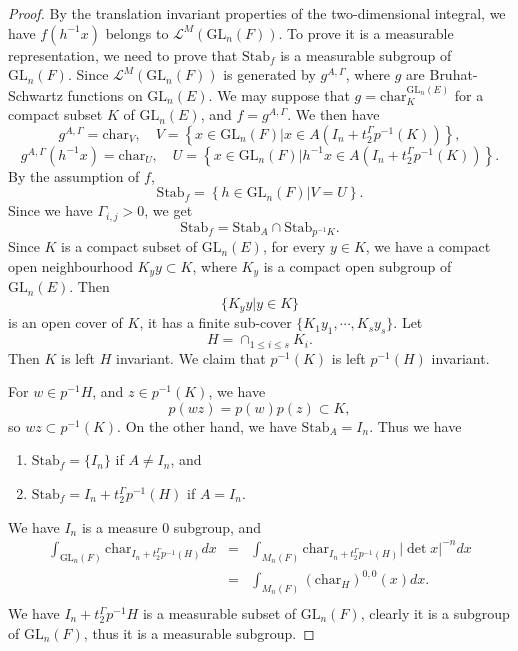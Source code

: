 \documentclass[10pt,a4paper]{amsart}
\def  \Char     {\mathrm{char}}
\def  \GL        {\mathrm{GL}}
\def  \Stab     {\mathrm{Stab}}
\def  \cl       {\mathcal{L}}
\begin{document}
\begin{proof}
	By the translation invariant properties of the two-dimensional integral, we have $f(h^{-1}x) $ belongs to $\cl^M(\GL_n(F))$. To prove it is a measurable representation, we need to prove that 
$\mathrm{Stab}_f $ is  a measurable subgroup of $\GL_n(F)$.   Since $\cl^M(\GL_n(F))$ is generated by $g^{A, \Gamma}$, where $g$ are Bruhat-Schwartz functions on $\GL_n(E)$. We may suppose that $g = \Char^{\GL_n(E)}_K$ for a compact  subset $K$ of $\GL_n(E)$, and  $f = g^{A, \Gamma}$.  We then have
$$
g^{A, \Gamma} = \Char_V,   \quad   V=\left\{x \in \GL_n(F) |  x  \in  A(I_n+ t_2^{\Gamma} p^{-1}(K))  \right \},
$$
$$
g^{A, \Gamma} (h^{-1}x) = \Char_U,   \quad  U=\left\{x \in \GL_n(F) | h^{-1}x  \in  A(I_n+ t_2^{\Gamma} p^{-1}(K))  \right \}.
$$
By the assumption of $f$,
$$
\Stab_f = \left\{ h \in \GL_n(F)|  V=U \right\}.
$$
Since we have $\Gamma_{i,j} >0$, we get
$$
\Stab_f = \Stab_{A} \cap  \Stab_{p^{-1}K}.
$$
Since $K$ is a compact subset of $\GL_n(E)$,  for every $y \in K$, we have a compact open neighbourhood $K_yy \subset K$, where $K_y$ is a compact open subgroup of $\GL_n(E)$. Then 
$$
\{ K_yy| y \in K\}
$$ 
is an open cover of $K $, it has a finite  sub-cover $\{K_1y_1, \cdots,  K_sy_s \}$. Let
$$
H=  \cap_{1 \leq i \leq s} K_i.
$$
Then $K$ is left $H$ invariant. We claim that   $p^{-1}(K)$ is left $p^{-1}(H)$ invariant.

For  $w \in p^{-1}H$, and $z \in p^{-1}(K)$, we have
$$
p(wz)=p(w) p(z) \subset K,
$$
so $wz \subset p^{-1}(K)$.  On the other hand,  we have $\Stab_{A} =I_n$.  Thus  we have
\begin{enumerate}
	\item $\Stab_f=\{I_n\}$  if $A  \neq I_n$, and
	 \item  $\Stab_f =  I_n+ t_2^{\Gamma}p^{-1}(H)$ if $A= I_n$. 

\end{enumerate}
 We have $I_n$ is a measure $0$ subgroup, and 
\begin{eqnarray*}
	\int_{\GL_n(F)} \Char_{I_n+t_2^{\Gamma}p^{-1 }(H)}dx  &=& \int_{M_n (F)}  \Char_{I_n+t_2^{\Gamma}p^{-1}(H)} |\det x|^{-n}  dx  \\
	&=&\int_{M_n(F)} (\Char_H)^{0,0}(x) dx.  \\
 \end{eqnarray*}
We have $I_n+ t_2^{\Gamma}p^{-1}H$ is a measurable subset of $\GL_n(F)$,   clearly it is a subgroup of $\GL_n(F)$,  thus it is a measurable subgroup.
\end{proof}
\end{document}
